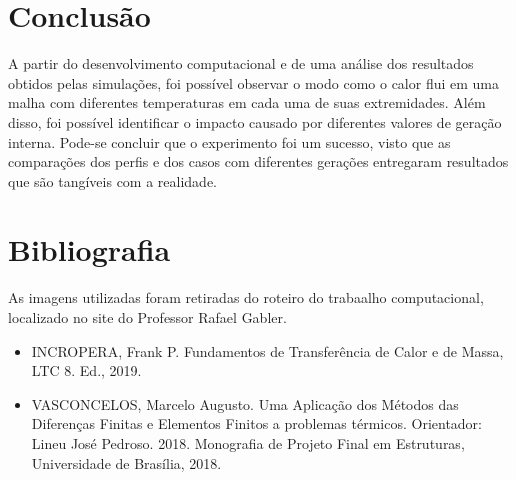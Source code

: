 \documentclass[article]{abntex2}
\begin{document}
\section{Conclusão}
A partir do desenvolvimento computacional e de uma análise dos resultados obtidos pelas simulações, foi possível observar o modo como o calor flui em uma malha com diferentes temperaturas em cada uma de suas extremidades. Além disso, foi possível identificar o impacto causado por diferentes valores de geração interna. 
Pode-se concluir que o experimento foi um sucesso, visto que as comparações dos perfis e dos casos com diferentes gerações entregaram resultados que são tangíveis com a realidade. 

\section{Bibliografia}
As imagens utilizadas foram retiradas do roteiro do trabaalho computacional, localizado no site do Professor Rafael Gabler.
\newline

\begin{itemize}
    \item INCROPERA, Frank P. Fundamentos de Transferência de Calor e de Massa, LTC 8. Ed., 2019.
    \item VASCONCELOS, Marcelo Augusto. Uma Aplicação dos Métodos das Diferenças Finitas e Elementos Finitos a problemas térmicos. Orientador: Lineu José Pedroso. 2018. Monografia de Projeto Final em Estruturas, Universidade de Brasília, 2018.
\end{itemize}


\newpage
\end{document}
